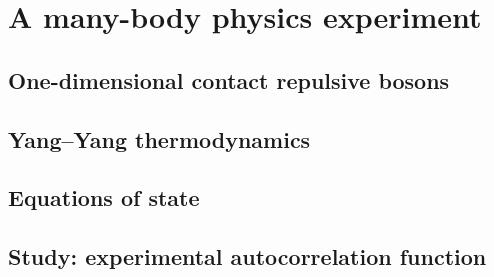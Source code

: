 
\renewcommand{\thechapter}{4}

\chapter{A many-body physics experiment}

\section{One-dimensional contact repulsive bosons}

\section{Yang--Yang thermodynamics}

\section{Equations of state}

\section{Study: experimental autocorrelation function}


